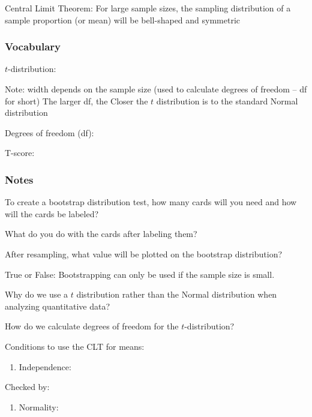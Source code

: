 \documentclass[
]{report}
\providecommand{\tightlist}{%
  \setlength{\itemsep}{0pt}\setlength{\parskip}{0pt}}
\newcommand{\rgs}{\vspace{12pt}} %
\newcommand{\rgi}{\hspace{24pt}}  %
\begin{document}
Central Limit Theorem: For large sample sizes, the sampling distribution of a sample proportion (or mean) will be bell-shaped and symmetric

\hypertarget{vocabulary-17}{%
\subsubsection*{Vocabulary}\label{vocabulary-17}}

\(t\)-distribution:
\rgs 

\rgi Note: width depends on the sample size (used to calculate degrees of freedom -- df for short)
\rgi The larger df, the Closer the \(t\) distribution is to the standard Normal distribution

Degrees of freedom (df):
\rgs 

T-score:
\rgs 

\hypertarget{notes-24}{%
\subsubsection*{Notes}\label{notes-24}}

To create a bootstrap distribution test, how many cards will you need and how will the cards be labeled?
\rgs 

What do you do with the cards after labeling them?
\rgs 

After resampling, what value will be plotted on the bootstrap distribution?
\rgs 

True or False: Bootstrapping can only be used if the sample size is small.
\rgs 

Why do we use a \(t\) distribution rather than the Normal distribution when analyzing quantitative data?
\rgs 

How do we calculate degrees of freedom for the \(t\)-distribution?
\rgs 

Conditions to use the CLT for means:

\begin{enumerate}
\def\labelenumi{\arabic{enumi}.}
\tightlist
\item
  Independence:
  \rgs 
\end{enumerate}

\rgi Checked by:
\rgs 

\begin{enumerate}
\def\labelenumi{\arabic{enumi}.}
\setcounter{enumi}{1}
\tightlist
\item
  Normality:
  \rgs 
\end{enumerate}
\end{document}
